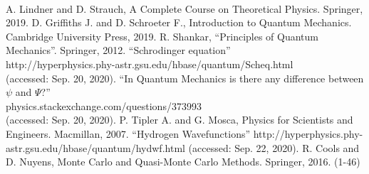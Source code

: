 \documentclass{aa}%
\begin{document}
\newpage~\newpage
\begin{thebibliography}{00}
	 A. Lindner and D. Strauch, A Complete Course on Theoretical Physics. Springer, 2019.
	 D. Griffiths J. and D. Schroeter F., Introduction to Quantum Mechanics. Cambridge University Press, 2019.
	 R. Shankar, ``Principles of Quantum Mechanics''. Springer, 2012.
		``Schrodinger equation''\\
	http://hyperphysics.phy-astr.gsu.edu/hbase/quantum/Scheq.html\\
	(accessed: Sep. 20, 2020).
	 ``In Quantum Mechanics is there any difference between $\psi$ and $\Psi$?''\\
	physics.stackexchange.com/questions/373993\\
	(accessed: Sep. 20, 2020).
	 P. Tipler A. and G. Mosca, Physics for Scientists and Engineers. Macmillan, 2007.
	 ``Hydrogen Wavefunctions'' http://hyperphysics.phy-astr.gsu.edu/hbase/quantum/hydwf.html (accessed: Sep. 22, 2020).
	 R. Cools and D. Nuyens, Monte Carlo and Quasi-Monte Carlo Methods. Springer, 2016. (1-46)
\end{thebibliography}
\end{document}
